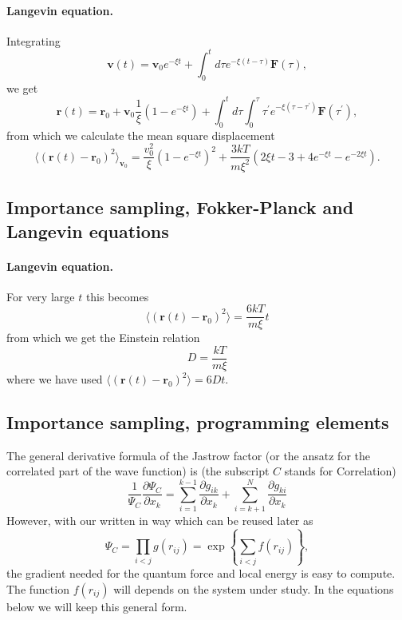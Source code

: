 \documentclass[%
oneside,                 %
final,                   %
10pt]{article}
\begin{document}
\paragraph{Langevin equation.}
Integrating 
 \[ 
\mathbf{v}(t)=\mathbf{v}_{0}e^{-\xi t}+\int_{0}^{t}d\tau e^{-\xi (t-\tau )}\mathbf{F }(\tau ), 
\] 
we get
\[
\mathbf{r}(t)=\mathbf{r}_{0}+\mathbf{v}_{0}\frac{1}{\xi }(1-e^{-\xi t})+
\int_0^td\tau \int_0^{\tau}\tau ^{\prime } e^{-\xi (\tau -\tau ^{\prime })}\mathbf{F}(\tau ^{\prime }), 
\]
from which we calculate the mean square displacement 
\[
\langle ( \mathbf{r}(t)-\mathbf{r}_{0})^{2}\rangle _{\mathbf{v}_{0}}=\frac{v_0^2}{\xi}(1-e^{-\xi t})^{2}+\frac{3kT}{m\xi ^{2}}(2\xi t-3+4e^{-\xi t}-e^{-2\xi t}). 
\]



\subsection{Importance sampling, Fokker-Planck and Langevin equations}

\paragraph{Langevin equation.}
For very large $t$ this becomes
\[
\langle (\mathbf{r}(t)-\mathbf{r}_{0})^{2}\rangle =\frac{6kT}{m\xi }t 
\] 
from which we get the Einstein relation  
 \[ 
D= \frac{kT}{m\xi } 
\] 	
where we have used $\langle (\mathbf{r}(t)-\mathbf{r}_{0})^{2}\rangle =6Dt$.



\subsection{Importance sampling, programming elements}

The general derivative formula of the Jastrow factor (or the ansatz for the correlated part of the wave function) is (the subscript $C$ stands for Correlation)
\[
\frac{1}{\Psi_C}\frac{\partial \Psi_C}{\partial x_k} =
\sum_{i=1}^{k-1}\frac{\partial g_{ik}}{\partial x_k}
+
\sum_{i=k+1}^{N}\frac{\partial g_{ki}}{\partial x_k}
\]
However, 
with our written in way which can be reused later as
\[
\Psi_C=\prod_{i< j}g(r_{ij})= \exp{\left\{\sum_{i<j}f(r_{ij})\right\}},
\]
the gradient needed for the quantum force and local energy is easy to compute.  
The function $f(r_{ij})$ will depends on the system under study. In the equations below we will keep this general form.
\end{document}
